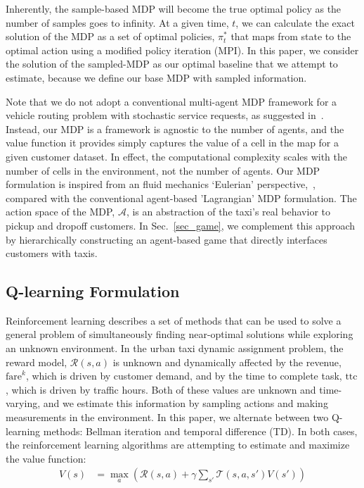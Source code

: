 \documentclass[journal]{IEEEtran}
\newcommand{\ttc}{\mathrm{ttc}}
\begin{document}
 Inherently, the sample-based MDP will become the true optimal policy as the number of samples goes to infinity. At a given time, $t$, we can calculate the exact solution of the MDP as a set of optimal policies, $\pi_t^*$ that maps from state to the optimal action using a modified policy iteration (MPI). In this paper, we consider the solution of the sampled-MDP as our optimal baseline that we attempt to estimate, because we define our base MDP with sampled information. 

Note that we do not adopt a conventional multi-agent MDP framework for a vehicle routing problem with stochastic service requests, as suggested in~\cite{ulmer_2018}. Instead, our MDP is a framework is agnostic to the number of agents, and the value function it provides simply captures the value of a cell in the map for a given customer dataset. In effect, the computational complexity scales with the number of cells in the environment, not the number of agents. Our MDP formulation is inspired from an fluid mechanics `Eulerian' perspective,~\cite{Bandyopadhyay_2017}, compared with the conventional agent-based 'Lagrangian' MDP formulation. The action space of the MDP, $\mathcal{A}$, is an abstraction of the taxi's real behavior to pickup and dropoff customers. In Sec.~\ref{sec_game}, we complement this approach by hierarchically constructing an agent-based game that directly interfaces customers with taxis. 

\subsection{Q-learning Formulation}
Reinforcement learning describes a set of methods that can be used to solve a general problem of simultaneously finding near-optimal solutions while exploring an unknown environment. In the urban taxi dynamic assignment problem, the reward model, $\mathcal{R}(s,a)$ is unknown and dynamically affected by the revenue, $\mathrm{fare}^k$, which is driven by customer demand, and by the time to complete task, $\ttc$, which is driven by traffic hours. Both of these values are unknown and time-varying, and we estimate this information by sampling actions and making measurements in the environment. In this paper, we alternate between two Q-learning methods: Bellman iteration and temporal difference (TD). In both cases, the reinforcement learning algorithms are attempting to estimate and maximize the value function: 
\begin{align*}
    V(s) &= \max_a (\mathcal{R}(s,a) + \gamma \sum_{s'} \mathcal{T}(s,a,s') V(s'))
\end{align*}
\end{document}
